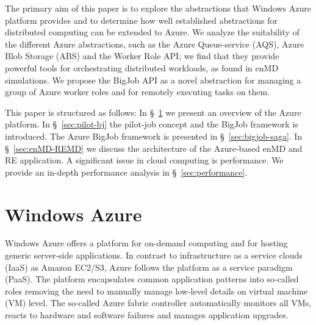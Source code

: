 \documentclass[conference,final]{IEEEtran}
\newcommand{\up}{\vspace*{-1em}}
\newcommand{\alnote}[1]{ {\textcolor{blue} { ***AL: #1 }}}
\newcommand{\jhanote}[1]{ {\textcolor{red} { ***SJ: #1 }}}
\newcommand{\alnote}[1]{}
\newcommand{\jhanote}[1]{}
\begin{document}
The primary aim of this paper is to explore the abstractions that
Windows Azure platform provides and to determine how well established
abstractions for distributed computing can be extended to Azure.  We
analyze the suitability of the different Azure abstractions, such as
the Azure Queue-service (AQS), Azure Blob Storage (ABS) and the Worker
Role API; we find that they provide powerful tools for orchestrating
distributed workloads, as found in enMD simulations.  We propose the
BigJob API as a novel abstraction for managing a group of Azure worker
roles and for remotely executing tasks on them.





This paper is structured as follows: In \S~\ref{sec:azure} we present
an overview of the Azure platform. In \S~\ref{sec:pilot-bj} the pilot-job 
concept and the BigJob framework is introduced. The Azure BigJob framework 
is presented in \S~\ref{sec:bigjob-saga}.
In \S~\ref{sec:enMD-REMD} we discuss the
architecture of the Azure-based enMD and RE application.  A
significant issue in cloud computing is performance. We provide an
in-depth performance analysis in \S~\ref{sec:performance}.

\up
\section{Windows Azure}
\label{sec:azure}
\up
Windows Azure offers a platform for on-demand computing and for
hosting generic server-side applications.  In contrast to
infrastructure as a service clouds (IaaS) as Amazon EC2/S3, Azure
follows the platform as a service paradigm (PaaS).  The platform
encapsulates common application patterns into so-called roles removing
the need to manually manage low-level details on virtual machine (VM)
level.  The so-called Azure fabric controller automatically monitors
all VMs, reacts to hardware and software failures and manages
application upgrades.
\end{document}
